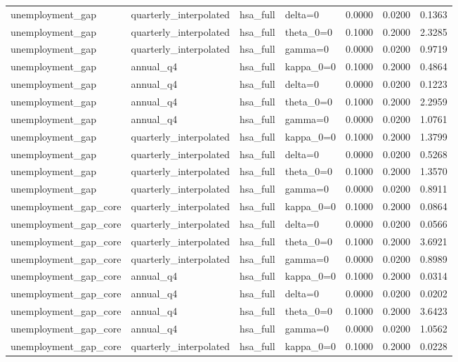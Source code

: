 \begin{tabular}{llllrrr}
unemployment\_gap & quarterly\_interpolated & hsa\_full & delta=0 & 0.0000 & 0.0200 & 0.1363 \\
unemployment\_gap & quarterly\_interpolated & hsa\_full & theta\_0=0 & 0.1000 & 0.2000 & 2.3285 \\
unemployment\_gap & quarterly\_interpolated & hsa\_full & gamma=0 & 0.0000 & 0.0200 & 0.9719 \\
unemployment\_gap & annual\_q4 & hsa\_full & kappa\_0=0 & 0.1000 & 0.2000 & 0.4864 \\
unemployment\_gap & annual\_q4 & hsa\_full & delta=0 & 0.0000 & 0.0200 & 0.1223 \\
unemployment\_gap & annual\_q4 & hsa\_full & theta\_0=0 & 0.1000 & 0.2000 & 2.2959 \\
unemployment\_gap & annual\_q4 & hsa\_full & gamma=0 & 0.0000 & 0.0200 & 1.0761 \\
unemployment\_gap & quarterly\_interpolated & hsa\_full & kappa\_0=0 & 0.1000 & 0.2000 & 1.3799 \\
unemployment\_gap & quarterly\_interpolated & hsa\_full & delta=0 & 0.0000 & 0.0200 & 0.5268 \\
unemployment\_gap & quarterly\_interpolated & hsa\_full & theta\_0=0 & 0.1000 & 0.2000 & 1.3570 \\
unemployment\_gap & quarterly\_interpolated & hsa\_full & gamma=0 & 0.0000 & 0.0200 & 0.8911 \\
unemployment\_gap\_core & quarterly\_interpolated & hsa\_full & kappa\_0=0 & 0.1000 & 0.2000 & 0.0864 \\
unemployment\_gap\_core & quarterly\_interpolated & hsa\_full & delta=0 & 0.0000 & 0.0200 & 0.0566 \\
unemployment\_gap\_core & quarterly\_interpolated & hsa\_full & theta\_0=0 & 0.1000 & 0.2000 & 3.6921 \\
unemployment\_gap\_core & quarterly\_interpolated & hsa\_full & gamma=0 & 0.0000 & 0.0200 & 0.8989 \\
unemployment\_gap\_core & annual\_q4 & hsa\_full & kappa\_0=0 & 0.1000 & 0.2000 & 0.0314 \\
unemployment\_gap\_core & annual\_q4 & hsa\_full & delta=0 & 0.0000 & 0.0200 & 0.0202 \\
unemployment\_gap\_core & annual\_q4 & hsa\_full & theta\_0=0 & 0.1000 & 0.2000 & 3.6423 \\
unemployment\_gap\_core & annual\_q4 & hsa\_full & gamma=0 & 0.0000 & 0.0200 & 1.0562 \\
unemployment\_gap\_core & quarterly\_interpolated & hsa\_full & kappa\_0=0 & 0.1000 & 0.2000 & 0.0228 \\

\end{tabular}
